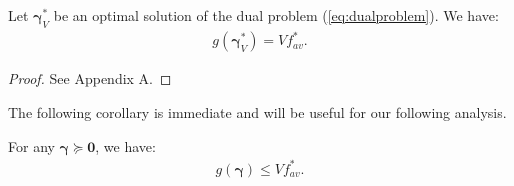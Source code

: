 \documentclass[journal]{IEEEtran}
\newcommand{\bv}[1]{{\boldsymbol{#1} }}
\begin{document}
\begin{thm}\label{thm:primaldualequal}
Let $\bv{\gamma}_V^*$ be an optimal solution of the dual problem (\ref{eq:dualproblem}). We  have:
\begin{eqnarray}
g(\bv{\gamma}^*_V)=Vf^*_{av}.
\end{eqnarray}
\end{thm}
\begin{proof}
See Appendix A. 
\end{proof}

The following corollary is immediate and will be useful for our following analysis.
\begin{coro}\label{coro:primaldualequal}
For any $\bv{\gamma}\succeq\bv{0}$, we have: 
\begin{eqnarray}
g(\bv{\gamma})\leq Vf^*_{av}.
\end{eqnarray}
\end{coro}

\end{document}
